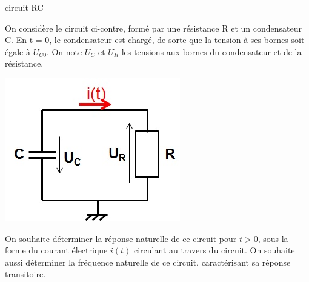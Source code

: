         \begin{exemple}{circuit RC}
          \label{ex:circuit_rc}
          
          \begin{minipage}[l]{0.7\linewidth}
            On considère le circuit ci-contre, formé par une résistance
            R et un condensateur C. En t = 0, le condensateur est
            chargé, de sorte que la tension à ses bornes soit égale à
            $U_{C0}$. On note $U_{C}$ et $U_{R}$ les tensions aux bornes
            du condensateur et de la résistance.
          \end{minipage} \hfill
          \begin{minipage}[r]{0.4\linewidth}
            \includegraphics[scale=0.5]{images/circuit_RC_reponse_naturelle.jpg}
          \end{minipage}
          
          On souhaite déterminer la réponse naturelle de ce circuit pour
          $t > 0$, sous la forme du courant électrique $i(t)$ circulant au
          travers du circuit. On souhaite aussi déterminer la fréquence
          naturelle de ce circuit, caractérisant sa réponse transitoire.
          

\end{exemple}
